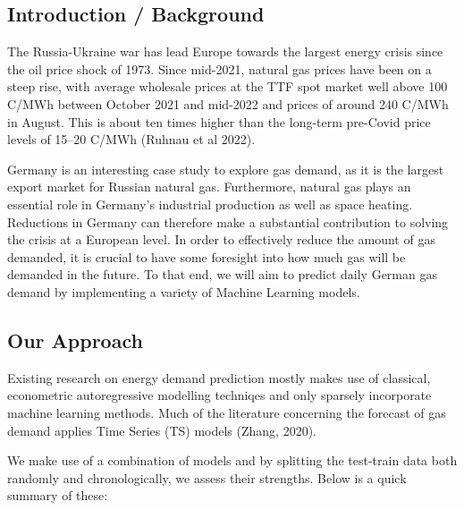 \documentclass[
]{article}
\begin{document}
\hypertarget{introduction-background}{%
\subsection{Introduction / Background}\label{introduction-background}}

The Russia-Ukraine war has lead Europe towards the largest energy crisis
since the oil price shock of 1973. Since mid-2021, natural gas prices
have been on a steep rise, with average wholesale prices at the TTF spot
market well above 100 C/MWh between October 2021 and mid-2022 and prices
of around 240 C/MWh in August. This is about ten times higher than the
long-term pre-Covid price levels of 15--20 C/MWh (Ruhnau et al 2022).

Germany is an interesting case study to explore gas demand, as it is the
largest export market for Russian natural gas. Furthermore, natural gas
plays an essential role in Germany's industrial production as well as
space heating. Reductions in Germany can therefore make a substantial
contribution to solving the crisis at a European level. In order to
effectively reduce the amount of gas demanded, it is crucial to have
some foresight into how much gas will be demanded in the future. To that
end, we will aim to predict daily German gas demand by implementing a
variety of Machine Learning models.

\hypertarget{our-approach}{%
\subsection{Our Approach}\label{our-approach}}

Existing research on energy demand prediction mostly makes use of
classical, econometric autoregressive modelling techniqes and only
sparsely incorporate machine learning methods. Much of the literature
concerning the forecast of gas demand applies Time Series (TS) models
(Zhang, 2020).

We make use of a combination of models and by splitting the test-train
data both randomly and chronologically, we assess their strengths. Below
is a quick summary of these:
\end{document}
